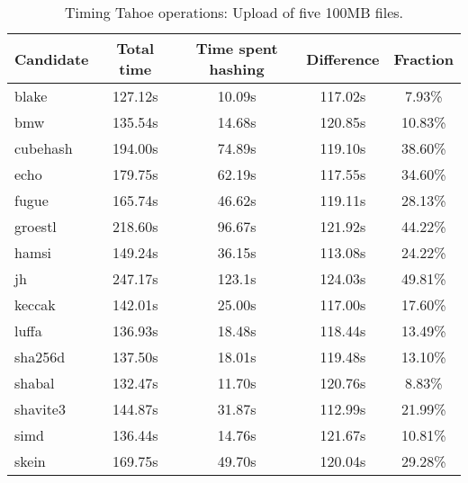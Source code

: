 \begin{table}[h]
  \centering
  \begin{tabular}{ | l | c | c | c | c | }
    \hline
    Candidate & Total time & Time spent hashing & Difference & Fraction \\ \hline
    blake & 127.12s & 10.09s & 117.02s & 7.93\% \\ \hline
    bmw & 135.54s & 14.68s & 120.85s & 10.83\% \\ \hline
    cubehash & 194.00s & 74.89s & 119.10s & 38.60\% \\ \hline
    echo & 179.75s & 62.19s & 117.55s & 34.60\% \\ \hline
    fugue & 165.74s & 46.62s & 119.11s & 28.13\% \\ \hline
    groestl & 218.60s & 96.67s & 121.92s & 44.22\% \\ \hline
    hamsi & 149.24s & 36.15s & 113.08s & 24.22\% \\ \hline
    jh & 247.17s & 123.1s & 124.03s & 49.81\% \\ \hline
    keccak & 142.01s & 25.00s & 117.00s & 17.60\% \\ \hline
    luffa & 136.93s & 18.48s & 118.44s & 13.49\% \\ \hline
    sha256d & 137.50s & 18.01s & 119.48s & 13.10\% \\ \hline
    shabal & 132.47s & 11.70s & 120.76s & 8.83\% \\ \hline
    shavite3 & 144.87s & 31.87s & 112.99s & 21.99\% \\ \hline
    simd & 136.44s & 14.76s & 121.67s & 10.81\% \\ \hline
    skein & 169.75s & 49.70s & 120.04s & 29.28\% \\ \hline
  \end{tabular}
  \caption{Timing Tahoe operations: Upload of five 100MB files.}
  \label{tbl:hashingtimes:put100mb}
\end{table}

